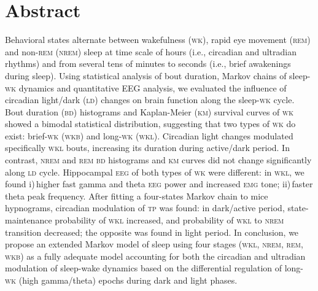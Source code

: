 \documentclass[10pt,letterpaper]{article}
\def\EMG/{\textsc{emg}}
\def\EEG/{\textsc{eeg}}
\def\REM/{\textsc{rem}}
\def\NREM/{\textsc{nrem}}
\def\WK/{\textsc{wk}}
\def\WKL/{\textsc{wkl}}
\def\WKB/{\textsc{wkb}}
\def\BD/{\textsc{bd}}
\def\TP/{\textsc{tp}}
\def\KM/{\textsc{km}}
\def\LD/{\textsc{ld}}
\def\EEG/{\textsc{eeg}}
\def\EMG/{\textsc{emg}}
\begin{document}
\section*{Abstract}
Behavioral states alternate between wakefulness (\WK/), rapid eye movement (\REM/) and non-\REM/ (\NREM/) sleep  at time scale of hours (i.e., circadian and ultradian rhythms) and from several tens of minutes to seconds (i.e., brief awakenings during sleep). Using statistical analysis of bout duration,   Markov chains of sleep-\WK/ dynamics and quantitative EEG  analysis, we evaluated  the influence of circadian light/dark (\LD/) changes on brain function along the sleep-\WK/ cycle. Bout duration (\BD/) histograms and Kaplan-Meier (\KM/) survival curves of \WK/  showed a bimodal statistical distribution, suggesting that  two types of \WK/ do exist:  brief-\WK/ (\WKB/) and long-\WK/ (\WKL/). Circadian light changes modulated specifically \WKL/ bouts, increasing its duration during active/dark period. In contrast, \NREM/ and \REM/ \BD/ histograms and \KM/ curves did not change significantly along \LD/ cycle.  Hippocampal \EEG/ of both types of \WK/ were different: in \WKL/, we found i)\,higher  fast gamma and theta \EEG/ power and increased \EMG/ tone; ii)\,faster theta peak frequency. After fitting a four-states Markov chain to mice hypnograms, circadian modulation of \TP/ was found:  in dark/active period,  state-maintenance probability of \WKL/ increased, and probability  of \WKL/ to \NREM/ transition  decreased; the opposite was found in light period. In conclusion, we propose an extended Markov model of sleep using four stages (\WKL/,  \NREM/, \REM/, \WKB/) as a fully adequate model accounting for both the circadian and ultradian modulation of sleep-wake dynamics based on the differential regulation of long-\WK/  (high gamma/theta) epochs  during dark and light phases.


\linenumbers
\end{document}
